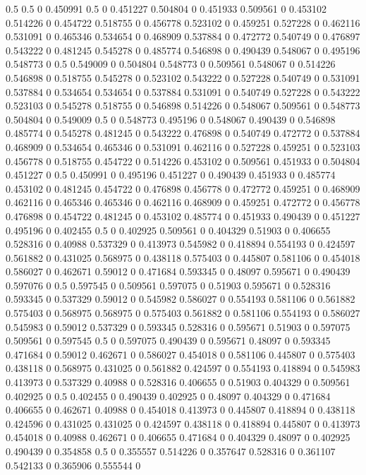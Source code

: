 0.5 0.5 0
0.450991 0.5 0
0.451227 0.504804 0
0.451933 0.509561 0
0.453102 0.514226 0
0.454722 0.518755 0
0.456778 0.523102 0
0.459251 0.527228 0
0.462116 0.531091 0
0.465346 0.534654 0
0.468909 0.537884 0
0.472772 0.540749 0
0.476897 0.543222 0
0.481245 0.545278 0
0.485774 0.546898 0
0.490439 0.548067 0
0.495196 0.548773 0
0.5 0.549009 0
0.504804 0.548773 0
0.509561 0.548067 0
0.514226 0.546898 0
0.518755 0.545278 0
0.523102 0.543222 0
0.527228 0.540749 0
0.531091 0.537884 0
0.534654 0.534654 0
0.537884 0.531091 0
0.540749 0.527228 0
0.543222 0.523103 0
0.545278 0.518755 0
0.546898 0.514226 0
0.548067 0.509561 0
0.548773 0.504804 0
0.549009 0.5 0
0.548773 0.495196 0
0.548067 0.490439 0
0.546898 0.485774 0
0.545278 0.481245 0
0.543222 0.476898 0
0.540749 0.472772 0
0.537884 0.468909 0
0.534654 0.465346 0
0.531091 0.462116 0
0.527228 0.459251 0
0.523103 0.456778 0
0.518755 0.454722 0
0.514226 0.453102 0
0.509561 0.451933 0
0.504804 0.451227 0
0.5 0.450991 0
0.495196 0.451227 0
0.490439 0.451933 0
0.485774 0.453102 0
0.481245 0.454722 0
0.476898 0.456778 0
0.472772 0.459251 0
0.468909 0.462116 0
0.465346 0.465346 0
0.462116 0.468909 0
0.459251 0.472772 0
0.456778 0.476898 0
0.454722 0.481245 0
0.453102 0.485774 0
0.451933 0.490439 0
0.451227 0.495196 0
0.402455 0.5 0
0.402925 0.509561 0
0.404329 0.51903 0
0.406655 0.528316 0
0.40988 0.537329 0
0.413973 0.545982 0
0.418894 0.554193 0
0.424597 0.561882 0
0.431025 0.568975 0
0.438118 0.575403 0
0.445807 0.581106 0
0.454018 0.586027 0
0.462671 0.59012 0
0.471684 0.593345 0
0.48097 0.595671 0
0.490439 0.597076 0
0.5 0.597545 0
0.509561 0.597075 0
0.51903 0.595671 0
0.528316 0.593345 0
0.537329 0.59012 0
0.545982 0.586027 0
0.554193 0.581106 0
0.561882 0.575403 0
0.568975 0.568975 0
0.575403 0.561882 0
0.581106 0.554193 0
0.586027 0.545983 0
0.59012 0.537329 0
0.593345 0.528316 0
0.595671 0.51903 0
0.597075 0.509561 0
0.597545 0.5 0
0.597075 0.490439 0
0.595671 0.48097 0
0.593345 0.471684 0
0.59012 0.462671 0
0.586027 0.454018 0
0.581106 0.445807 0
0.575403 0.438118 0
0.568975 0.431025 0
0.561882 0.424597 0
0.554193 0.418894 0
0.545983 0.413973 0
0.537329 0.40988 0
0.528316 0.406655 0
0.51903 0.404329 0
0.509561 0.402925 0
0.5 0.402455 0
0.490439 0.402925 0
0.48097 0.404329 0
0.471684 0.406655 0
0.462671 0.40988 0
0.454018 0.413973 0
0.445807 0.418894 0
0.438118 0.424596 0
0.431025 0.431025 0
0.424597 0.438118 0
0.418894 0.445807 0
0.413973 0.454018 0
0.40988 0.462671 0
0.406655 0.471684 0
0.404329 0.48097 0
0.402925 0.490439 0
0.354858 0.5 0
0.355557 0.514226 0
0.357647 0.528316 0
0.361107 0.542133 0
0.365906 0.555544 0
